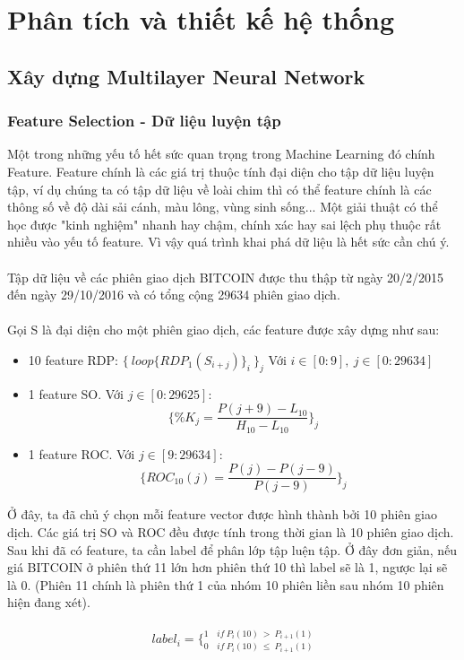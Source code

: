 \chapter{Phân tích và thiết kế hệ thống}

\section{Xây dựng Multilayer Neural Network}
\subsection{Feature Selection - Dữ liệu luyện tập}
Một trong những yếu tố hết sức quan trọng trong Machine Learning đó chính Feature. 
Feature chính là các giá trị thuộc tính đại diện cho tập dữ liệu luyện tập, ví dụ 
chúng ta có tập dữ liệu về loài chim thì có thể feature chính là các thông số 
về độ dài sải cánh, màu lông, vùng sinh sống... Một giải thuật có thể học được 
"kinh nghiệm" nhanh hay chậm, chính xác hay sai lệch phụ thuộc rất nhiều vào yếu 
tố feature. Vì vậy quá trình khai phá dữ liệu là hết sức cần chú ý.\\\\
Tập dữ liệu về các phiên giao dịch BITCOIN được thu thập từ ngày 20/2/2015 đến 
ngày 29/10/2016 và có tổng cộng 29634 phiên giao dịch.\\\\
Gọi S là đại diện cho một phiên giao dịch, các feature được xây dựng như sau:
\begin{itemize}
    \item 10 feature RDP: $\{ \: loop\{ RDP_1(S_{i+j})\}_i \: \}_j$ Với 
    $i \in [0:9], \: j \in [0:29634]$
    \item 1 feature SO. Với $ j \in [0:29625] $:\\
    \[
        \{ \%K_j = \frac{P(j+9)-L_{10}}{H_{10}-L_{10}} \}_j
    \]
    \item 1 feature ROC. Với $ j \in [9:29634] $:\\ 
    \[
        \{ ROC_{10}(j)= \frac{P(j) - P(j-9)}{P(j-9)} \}_j
    \]
\end{itemize}
Ở đây, ta đã chủ ý chọn mỗi feature vector được hình thành bởi 10 phiên giao 
dịch. Các giá trị SO và ROC đều được tính trong thời gian là 10 phiên giao dịch.
Sau khi đã có feature, ta cần label để phân lớp tập luện tập. Ở đây đơn giản, 
nếu giá BITCOIN ở phiên thứ 11 lớn hơn phiên thứ 10 thì label sẽ là 1, ngược
lại sẽ là 0. (Phiên 11 chính là phiên thứ 1 của nhóm 10 phiên liền sau nhóm 
10 phiên hiện đang xét).\\\\
\[
    label_i = \bigg \{ _{0 \quad if \: P_i(10) \: \leq \: P_{i+1}(1)} ^{1 \quad if \: P_i(10) \: > \: P_{i+1}(1)}
\]

